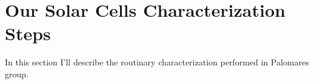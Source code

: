 \section{Our Solar Cells Characterization Steps}

	In this section I'll describe the routinary characterization performed in Palomares group.


